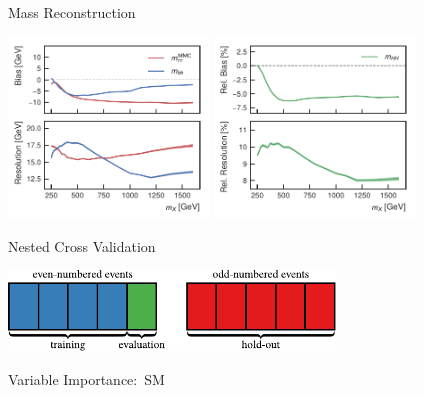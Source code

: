 \documentclass[11pt, xcolor={dvipsnames}, aspectratio=169]{beamer}
\begin{document}

\begin{frame}{Mass Reconstruction}
  \centering

  \includegraphics[width=0.4\textwidth]{mva/mass_resolution}%
  \includegraphics[width=0.4\textwidth]{mva/mhh_resolution}
\end{frame}


\begin{frame}{Nested Cross Validation}
  \centering

  \includegraphics[width=0.65\textwidth]{mva/kfold}
\end{frame}


\begin{frame}{Variable Importance:\ SM~\allbold{\HH}}
  \centering\footnotesize

  
\end{frame}

\end{document}
